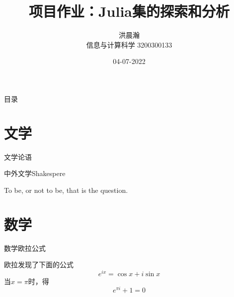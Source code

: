 \documentclass{beamer}
\begin{document}
\title{项目作业：Julia集的探索和分析}
\author{洪晨瀚 \\ 信息与计算科学 3200300133} 
\date{04-07-2022}
\frame{\titlepage}

%
\begin{frame}{目录}
  \tableofcontents[hideallsubsections]
\end{frame}

%
\section{文学}    %


\begin{frame}{文学}{论语}



\end{frame}

\begin{frame}{中外文学}{Shakespere}

To be, or not to be, that is the question.

\end{frame}


\section{数学}    %

\begin{frame}[t]{数学}{欧拉公式}  %

欧拉发现了下面的公式
$$
e^{ix} = \cos x + i \sin x
$$
当$x = \pi$时，得
$$
e^{\pi i} + 1 = 0
$$

\end{frame}
\end{document}
